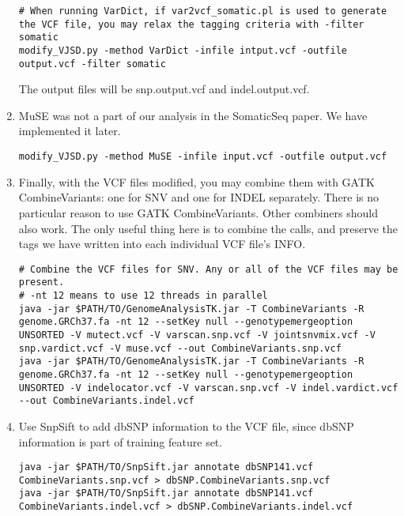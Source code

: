 \documentclass[10pt,letterpaper]{article}
\begin{document}
\begin{sloppypar}
\begin{enumerate}
\begin{lstlisting}
# When running VarDict, if var2vcf_somatic.pl is used to generate the VCF file, you may relax the tagging criteria with -filter somatic
modify_VJSD.py -method VarDict -infile intput.vcf -outfile output.vcf -filter somatic
\end{lstlisting}
	
The output files will be snp.output.vcf and indel.output.vcf. 


\item
MuSE was not a part of our analysis in the SomaticSeq paper. We have implemented it later. 
	
\begin{lstlisting}
modify_VJSD.py -method MuSE -infile input.vcf -outfile output.vcf
\end{lstlisting}

\item
Finally, with the VCF files modified, you may combine them with GATK CombineVariants: one for SNV and one for INDEL separately. There is no particular reason to use GATK CombineVariants. Other combiners should also work. The only useful thing here is to combine the calls, and preserve the tags we have written into each individual VCF file's INFO. 
	
\begin{lstlisting}
# Combine the VCF files for SNV. Any or all of the VCF files may be present.
# -nt 12 means to use 12 threads in parallel
java -jar $PATH/TO/GenomeAnalysisTK.jar -T CombineVariants -R genome.GRCh37.fa -nt 12 --setKey null --genotypemergeoption UNSORTED -V mutect.vcf -V varscan.snp.vcf -V jointsnvmix.vcf -V snp.vardict.vcf -V muse.vcf --out CombineVariants.snp.vcf
java -jar $PATH/TO/GenomeAnalysisTK.jar -T CombineVariants -R genome.GRCh37.fa -nt 12 --setKey null --genotypemergeoption UNSORTED -V indelocator.vcf -V varscan.snp.vcf -V indel.vardict.vcf --out CombineVariants.indel.vcf
\end{lstlisting}
	
	
\item
Use SnpSift to add dbSNP information to the VCF file, since dbSNP information is part of training feature set.
	
\begin{lstlisting}
java -jar $PATH/TO/SnpSift.jar annotate dbSNP141.vcf CombineVariants.snp.vcf > dbSNP.CombineVariants.snp.vcf
java -jar $PATH/TO/SnpSift.jar annotate dbSNP141.vcf CombineVariants.indel.vcf > dbSNP.CombineVariants.indel.vcf
\end{lstlisting}
	

\end{enumerate}
\end{sloppypar}
\end{document}
